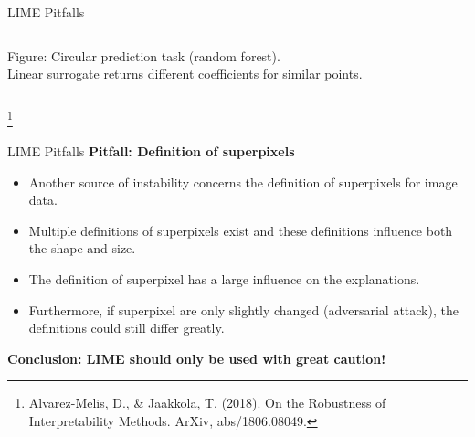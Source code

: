 \documentclass[11pt,compress,t,notes=noshow, xcolor=table]{beamer}
\begin{document}
\begin{vbframe}{LIME Pitfalls}
\begin{columns}
\begin{column}{0.48\textwidth}
\begin{center}
	\tiny{Figure: Circular prediction task (random forest). \\Linear surrogate returns different coefficients for similar points.}
	
	\end{center}
\end{column}
\end{columns}
\vspace{-0.2cm}
\footnote[frame]{Alvarez-Melis, D., \& Jaakkola, T. (2018). On the Robustness of Interpretability Methods. ArXiv, abs/1806.08049.}
\end{vbframe}

\begin{vbframe}{LIME Pitfalls}
\textbf{Pitfall: Definition of superpixels}
\begin{itemize}
	\item Another source of instability concerns the definition of superpixels for image data. 
	\item Multiple definitions of superpixels exist and these definitions influence both the shape and size. 
	\item The definition of superpixel has a large influence on the explanations. 
	\item Furthermore, if superpixel are only slightly changed (adversarial attack), the definitions could still differ greatly.  
\end{itemize}
\vspace{0.5cm}
\textbf{Conclusion: LIME should only be used with great caution!}

\end{vbframe}

%	


\endlecture
\end{document}
